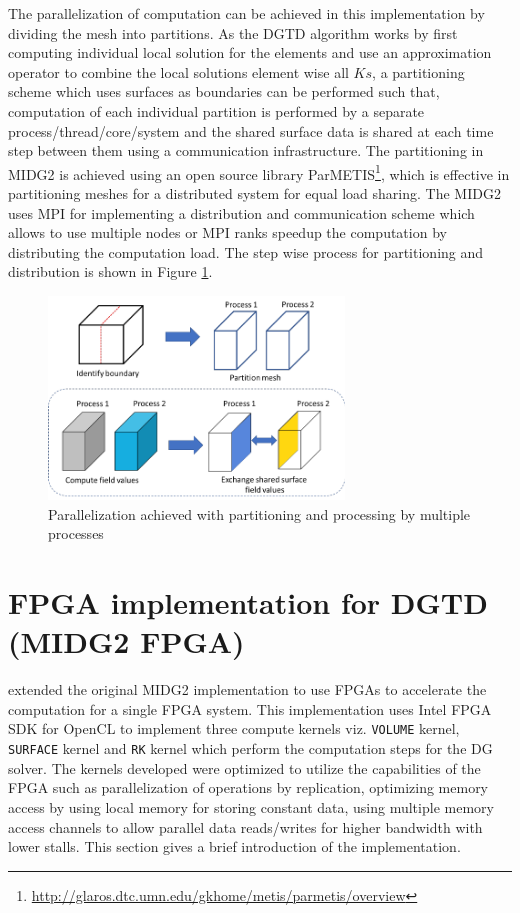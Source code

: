 The parallelization of computation can be achieved in this implementation by dividing
the mesh into partitions. As the \ac{DGTD} algorithm works by first computing individual
local solution for the elements and use an approximation operator to combine the local
solutions element wise all $Ks$,
a partitioning scheme which uses surfaces as boundaries can be performed such that,
computation of each individual partition is performed by a separate
process/thread/core/system and the shared surface data is shared at each time step
between them using a communication infrastructure. The partitioning in MIDG2 is
achieved using an open source library ParMETIS\footnote{\url{http://glaros.dtc.umn.edu/gkhome/metis/parmetis/overview}},
which is effective in partitioning meshes for a distributed system for equal load sharing.
The MIDG2 uses \ac{MPI} for implementing a distribution and communication scheme which
allows to use multiple nodes or MPI ranks speedup the computation by distributing the computation load.
The step wise process for partitioning and distribution is shown in Figure \ref{fig:partitioning}.
\begin{figure}[h]%
    \centering
    \includegraphics[width=0.7\textwidth]{images/partition_proc}
    \caption{Parallelization achieved with partitioning and processing by multiple processes}
    \label{fig:partitioning}
\end{figure}

\section{FPGA implementation for DGTD (MIDG2 FPGA)}
\label{sec:fpga_dg}

\textcite{kenter_opencl-based_2018} extended the original MIDG2 implementation to use
FPGAs to accelerate the computation for a single FPGA system. This implementation
uses Intel FPGA SDK for OpenCL to implement three compute kernels viz. \texttt{VOLUME} kernel,
\texttt{SURFACE} kernel and \texttt{RK} kernel which perform the computation steps for the \ac{DG} solver.
The kernels developed were optimized to utilize the capabilities of the FPGA such
as parallelization of operations by replication, optimizing memory access by using
local memory for storing constant data, using multiple memory access channels to allow parallel data
reads/writes for higher bandwidth with lower stalls. This section gives a brief
introduction of the implementation.

